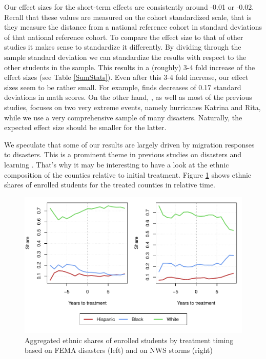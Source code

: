 Our effect sizes for the short-term effects are consistently around -0.01 or -0.02. Recall that these values are measured on the cohort standardized scale, that is they measure the distance from a national reference cohort in standard deviations of that national reference cohort. To compare the effect size to that of other studies it makes sense to standardize it differently. By dividing through the sample standard deviation we can standardize the results with respect to the other students in the sample. This results in a (roughly) 3-4 fold increase of the effect sizes (see Table \ref{SumStats}). Even after this 3-4 fold increase, our effect sizes seem to be rather small. For example, \cite{Sacerdote_2012} finds decreases of 0.17 standard deviations in math scores. On the other hand, \cite{Sacerdote_2012}, as well as most of the previous studies, focuses on two very extreme events, namely hurricanes Katrina and Rita, while we use a very comprehensive sample of many disasters. Naturally, the expected effect size should be smaller for the latter.

We speculate that some of our results are largely driven by migration responses to disasters. This is a prominent theme in previous studies on disasters and learning \citep{Pane_2008, Sacerdote_2012}. That's why it may be interesting to have a look at the ethnic composition of the counties relative to initial treatment. Figure \ref{EthnicComposition} shows ethnic shares of enrolled students for the treated counties in relative time.

\begin{figure}[!h]
	\centering
	\includegraphics[scale=1]{"../Code & Data/EthnicComposition.pdf"}
	\caption{Aggregated ethnic shares of enrolled students by treatment timing based on FEMA disasters (left) and on NWS storms (right)}
	\label{EthnicComposition}
\end{figure}

